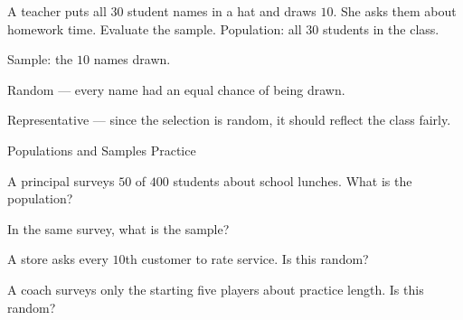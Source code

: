 \begin{stepExample}{A teacher puts all $30$ student names in a hat and draws $10$. She asks them about homework time. Evaluate the sample.}
     Population: all $30$ students in the class.

     Sample: the $10$ names drawn.

     Random — every name had an equal chance of being drawn.

     Representative — since the selection is random, it should reflect the class fairly.
\end{stepExample}


\newpage
\begin{stepPractice}{Populations and Samples Practice}
    \resetProblems

    \prob A principal surveys $50$ of $400$ students about school lunches. What is the population? \answerBlank[3cm]

    \prob In the same survey, what is the sample? \answerBlank[3cm]

    \prob A store asks every $10$th customer to rate service. Is this random? \answerBlank[3cm]

    \prob A coach surveys only the starting five players about practice length. Is this random? \answerBlank[3cm]

\end{stepPractice}
